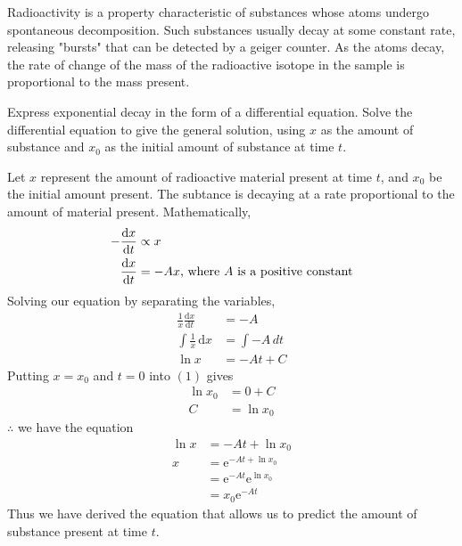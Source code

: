 \documentclass[11pt,a4paper]{book}
\begin{document}
\begin{example}

Radioactivity is a property characteristic of substances whose atoms
undergo spontaneous decomposition. Such substances usually decay at some constant rate, releasing "bursts"
that can be detected by a geiger counter. As the atoms decay, the
rate of change of the mass of the radioactive isotope in
the sample is proportional to the mass present.

\medskip

Express exponential decay in the form of a differential equation.
Solve the differential equation to give the general solution, using
$x$ as the amount of substance and $x_{0}$ as the initial amount
of substance at time $t$.

\Solution

Let $x$ represent the amount of radioactive material present at time
$t$, and $x_{0}$ be the initial amount present. The subtance is
decaying at a rate proportional to the amount of material present.
Mathematically,
\begin{align*}
-\frac{\mathrm{d}x}{\mathrm{d}t} & \propto x\\
\frac{\mathrm{d}x}{\mathrm{d}t} & =-Ax\text{, where \ensuremath{A} is a positive constant}
\end{align*}
Solving our equation by separating the variables,
\begin{align*}
\frac{1}{x}\frac{\mathrm{d}x}{\mathrm{d}t} & =-A\\
\int\frac{1}{x}\, \mathrm{d}x & =\int-A\,dt\\
\ln x & =-At+C\tag{ 1 }
\end{align*}
Putting $x=x_{0}$ and $t=0$ into $\left(1\right)$ gives
\begin{align*}
\ln x_{0} & =0+C\\
C & =\ln x_{0}
\end{align*}
$\therefore$ we have the equation
\begin{align*}
\ln x & =-At+\ln x_{0}\\
x & =\mathrm{e}^{-At+\ln x_{0}}\\
 & =\mathrm{e}^{-At}\mathrm{e}^{\ln x_{0}}\\
 & =x_{0}\mathrm{e}^{-At}
\end{align*}
Thus we have derived the equation that allows us to predict the amount
of substance present at time $t$.

\end{example}
\end{document}
